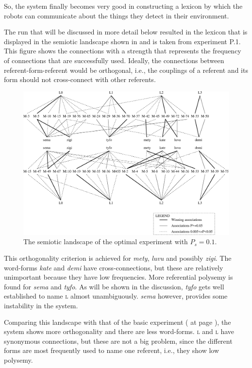 So, the system finally becomes very good in constructing a lexicon by which the robots can communicate about the things they detect in their environment.

The run that will be discussed in more detail below resulted in the lexicon that is displayed in the semiotic landscape shown in  and is taken from experiment P.1. This figure shows the connections with a strength that represents the frequency of connections that are successfully used. Ideally, the connections between referent-form-referent would be orthogonal, i.e., the couplings of a referent and its form should not cross-connect with other referents.\enlargethispage{\baselineskip}

\begin{figure}
\centerline{\includegraphics[width=\textwidth]{optimal/semiotic.eps}}
\caption{The semiotic landscape of the optimal experiment with $P_s=0.1$.}
\label{f:opt:semiotic}
\end{figure}

This orthogonality criterion is achieved for {\it mety}, {\it luvu} and possibly {\it zigi}. The word-forms {\it kate} and {\it demi} have cross-connections, but these are relatively unimportant because they have low frequencies. More referential polysemy is found for {\it sema} and {\it tyfo}. As will be shown in the discussion, {\it tyfo} gets well established to name \textsc{l} almost unambiguously. {\it sema} however, provides some instability in the system. 

Comparing this landscape with that of the basic experiment ( at page \pageref{f:st:semiotic}), the system shows more orthogonality and there are less word-forms. \textsc{l} and \textsc{l} have synonymous connections, but these are not a big problem, since the different forms are most frequently used to name one referent, i.e., they show low polysemy.

